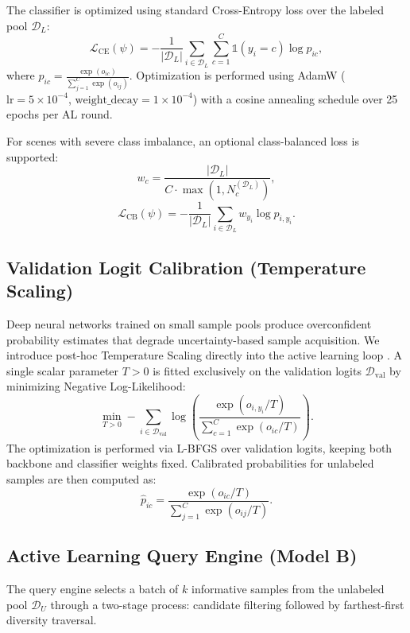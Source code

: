 \documentclass[conference,letterpaper]{IEEEtran}
\begin{document}
\vspace{0.3em}
The classifier is optimized using standard Cross-Entropy loss over the labeled pool $\mathcal{D}_L$:
\begin{equation}
\mathcal{L}_{\text{CE}}(\psi) = -\frac{1}{|\mathcal{D}_L|} \sum_{i \in \mathcal{D}_L} \sum_{c=1}^C \mathbb{1}(y_i = c) \log p_{ic},
\end{equation}
where $p_{ic} = \frac{\exp(o_{ic})}{\sum_{j=1}^C \exp(o_{ij})}$. Optimization is performed using AdamW ($\text{lr} = 5\times 10^{-4}$, $\text{weight\_decay} = 1\times 10^{-4}$) with a cosine annealing schedule over 25 epochs per AL round.

\vspace{0.3em}
For scenes with severe class imbalance, an optional class-balanced loss is supported:
\begin{equation}
w_c = \frac{|\mathcal{D}_L|}{C \cdot \max(1, N_c^{(\mathcal{D}_L)})},
\end{equation}
\begin{equation}
\mathcal{L}_{\text{CB}}(\psi) = -\frac{1}{|\mathcal{D}_L|} \sum_{i \in \mathcal{D}_L} w_{y_i} \log p_{i, y_i}.
\end{equation}

\subsection{Validation Logit Calibration (Temperature Scaling)}
Deep neural networks trained on small sample pools produce overconfident probability estimates that degrade uncertainty-based sample acquisition. We introduce post-hoc Temperature Scaling directly into the active learning loop \cite{guo2017}. A single scalar parameter $T > 0$ is fitted exclusively on the validation logits $\mathcal{D}_{\text{val}}$ by minimizing Negative Log-Likelihood:
\begin{equation}
\min_{T > 0} -\sum_{i \in \mathcal{D}_{\text{val}}} \log \left( \frac{\exp(o_{i, y_i} / T)}{\sum_{c=1}^C \exp(o_{ic} / T)} \right).
\end{equation}
The optimization is performed via L-BFGS over validation logits, keeping both backbone and classifier weights fixed. Calibrated probabilities for unlabeled samples are then computed as:
\begin{equation}
\hat{p}_{ic} = \frac{\exp(o_{ic} / T)}{\sum_{j=1}^C \exp(o_{ij} / T)}.
\end{equation}

\subsection{Active Learning Query Engine (Model B)}
The query engine selects a batch of $k$ informative samples from the unlabeled pool $\mathcal{D}_U$ through a two-stage process: candidate filtering followed by farthest-first diversity traversal.
\end{document}
